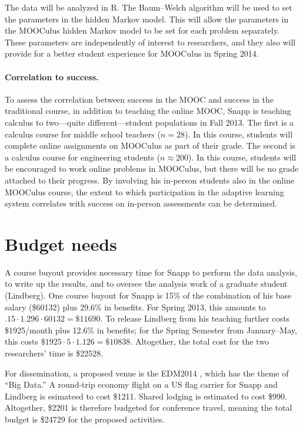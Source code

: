 \documentclass[12pt]{article}
\begin{document}
The data will be analyzed in R.  The Baum--Welch algorithm will be used
to set the parameters in the hidden Markov model. This will allow the
parameters in the MOOCulus hidden Markov model to be set for each
problem separately.  These parameters are independently of interest to
researchers, and they also will provide for a better student
experience for MOOCulus in Spring 2014.

\paragraph{Correlation to success.}

To assess the correlation between success in the MOOC and success in
the traditional course, in addition to teaching the online MOOC, Snapp
is teaching calculus to two---quite different---student populations in
Fall 2013.  The first is a calculus course for middle school teachers
($n=28$). In this course, students will complete online assignments on
MOOCulus as part of their grade.  The second is a calculus course for
engineering students ($n\approx 200$).  In this course, students will
be encouraged to work online problems in MOOCulus, but there will be
no grade attached to their progress.  By involving his in-person
students also in the online MOOCulus course, the extent to which
participation in the adaptive learning system correlates with success
on in-person assessments can be determined.

\section{Budget needs}

A course buyout provides necessary time for Snapp to perform the data
analysis, to write up the results, and to oversee the analysis work of
a graduate student (Lindberg).  One course buyout for Snapp is 15\% of
the combination of his base salary (\$60132) plus 29.6\% in
benefits. For Spring 2013, this amounts to $.15 \cdot 1.296\cdot
60132=\$11690$.  To release Lindberg from his teaching further costs
\$1925/month plus 12.6\% in benefits; for the Spring Semester from
January--May, this costs $\$1925 \cdot 5 \cdot 1.126 = \$10838$.
Altogether, the total cost for the two researchers' time is \$22528.

For dissemination, a proposed venue is the
EDM2014 \parencite{edm-2014}, which has the theme of ``Big Data.''  A
round-trip economy flight on a US flag carrier for Snapp and Lindberg
is esimateed to cost \$1211.  Shared lodging is estimated to cost
\$990.  Altogether, \$2201 is therefore budgeted for conference
travel, meaning the total budget is \$24729 for the proposed
activities.

\pagebreak
\printbibliography
\end{document}
